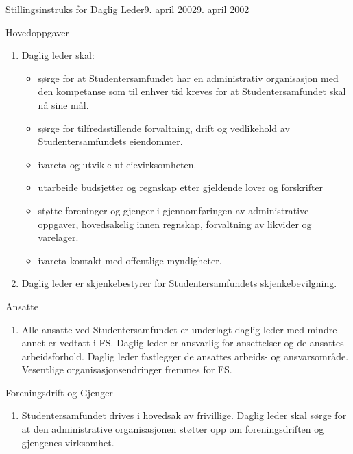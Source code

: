 \begin{instruks}{Stillingsinstruks for Daglig Leder}{9. april 2002}{9. april 2002}
    \begin{instruksledd}{Hovedoppgaver}
        \begin{enumerate}
            \item Daglig leder skal:
                \begin{itemize}
                    \item sørge for at Studentersamfundet har en administrativ organisasjon med den kompetanse som til
                        enhver tid kreves for at Studentersamfundet skal nå sine mål.
                    \item sørge for tilfredsstillende forvaltning, drift og vedlikehold av Studentersamfundets eiendommer.
                    \item ivareta og utvikle utleievirksomheten.
                    \item utarbeide budsjetter og regnskap etter gjeldende lover og forskrifter
                    \item støtte foreninger og gjenger i gjennomføringen av administrative oppgaver, hovedsakelig innen
                        regnskap, forvaltning av likvider og varelager.
                    \item ivareta kontakt med offentlige myndigheter.
                \end{itemize}
            \item Daglig leder er skjenkebestyrer for Studentersamfundets skjenkebevilgning.
        \end{enumerate}
    \end{instruksledd}

    \begin{instruksledd}{Ansatte}
        \begin{enumerate}
            \item Alle ansatte ved Studentersamfundet er underlagt daglig leder med mindre annet er vedtatt 
                i FS. Daglig leder er ansvarlig for
                ansettelser og de ansattes arbeidsforhold. Daglig leder fastlegger de ansattes arbeids- og ansvarsområde. Vesentlige
                organisasjonsendringer fremmes for FS.
        \end{enumerate}
    \end{instruksledd}

    \begin{instruksledd}{Foreningsdrift og Gjenger}
        \begin{enumerate}
            \item Studentersamfundet drives i hovedsak av frivillige. Daglig leder skal sørge for at den administrative organisasjonen
                støtter opp om foreningsdriften og gjengenes virksomhet.
        \end{enumerate}
    \end{instruksledd}


\end{instruks}
